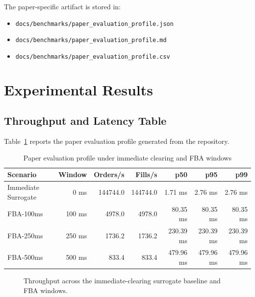 \documentclass[11pt]{article}
\begin{document}
The paper-specific artifact is stored in:

\begin{itemize}[leftmargin=1.5em]
  \item \texttt{docs/benchmarks/paper\_evaluation\_profile.json}
  \item \texttt{docs/benchmarks/paper\_evaluation\_profile.md}
  \item \texttt{docs/benchmarks/paper\_evaluation\_profile.csv}
\end{itemize}

\section{Experimental Results}

\subsection{Throughput and Latency Table}

Table~\ref{tab:eval} reports the paper evaluation profile generated from the repository.

\begin{table}[ht]
  \centering
  \caption{Paper evaluation profile under immediate clearing and FBA windows}
  \label{tab:eval}
  \begin{tabular}{lrrrrrr}
    \toprule
    Scenario & Window & Orders/s & Fills/s & p50 & p95 & p99 \\
    \midrule
    Immediate Surrogate & 0 ms   & 144744.0 & 144744.0 & 1.71 ms  & 2.76 ms  & 2.76 ms \\
    FBA-100ms           & 100 ms & 4978.0   & 4978.0   & 80.35 ms & 80.35 ms & 80.35 ms \\
    FBA-250ms           & 250 ms & 1736.2   & 1736.2   & 230.39 ms & 230.39 ms & 230.39 ms \\
    FBA-500ms           & 500 ms & 833.4    & 833.4    & 479.96 ms & 479.96 ms & 479.96 ms \\
    \bottomrule
  \end{tabular}
\end{table}

\begin{figure}[ht]
  \centering
  \caption{Throughput across the immediate-clearing surrogate baseline and FBA windows.}
  \label{fig:throughput}
\end{figure}
\end{document}
